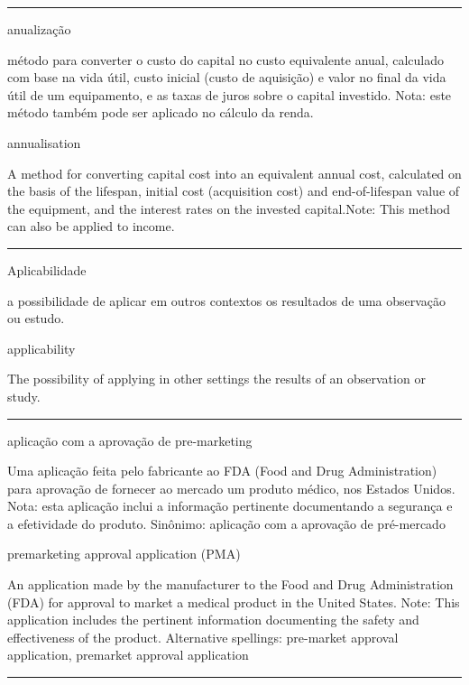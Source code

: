 \documentclass[
]{book}
\begin{document}
\begin{center}\rule{0.5\linewidth}{0.5pt}\end{center}

anualização

método para converter o custo do capital no custo equivalente anual, calculado com base na vida útil, custo inicial (custo de aquisição) e valor no final da vida útil de um equipamento, e as taxas de juros sobre o capital investido. Nota: este método também pode ser aplicado no cálculo da renda.

annualisation

A method for converting capital cost into an equivalent annual cost, calculated on the basis of the lifespan, initial cost (acquisition cost) and end-of-lifespan value of the equipment, and the interest rates on the invested capital.Note: This method can also be applied to income.

\begin{center}\rule{0.5\linewidth}{0.5pt}\end{center}

Aplicabilidade

a possibilidade de aplicar em outros contextos os resultados de uma observação ou estudo.

applicability

The possibility of applying in other settings the results of an observation or study.

\begin{center}\rule{0.5\linewidth}{0.5pt}\end{center}

aplicação com a aprovação de pre-marketing

Uma aplicação feita pelo fabricante ao FDA (Food and Drug Administration) para aprovação de fornecer ao mercado um produto médico, nos Estados Unidos. Nota: esta aplicação inclui a informação pertinente documentando a segurança e a efetividade do produto. Sinônimo: aplicação com a aprovação de pré-mercado

premarketing approval application (PMA)

An application made by the manufacturer to the Food and Drug Administration (FDA) for approval to market a medical product in the United States. Note: This application includes the pertinent information documenting the safety and effectiveness of the product. Alternative spellings: pre-market approval application, premarket approval application

\begin{center}\rule{0.5\linewidth}{0.5pt}\end{center}
\end{document}
